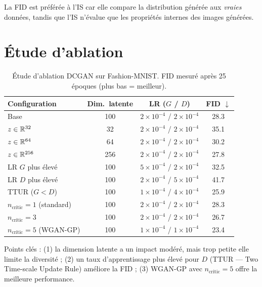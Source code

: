 \begin{remarque}
La FID est pr\'ef\'er\'ee \`a l'IS car elle compare la distribution g\'en\'er\'ee aux \emph{vraies} donn\'ees, tandis que l'IS n'\'evalue que les propri\'et\'es internes des images g\'en\'er\'ees.
\end{remarque}

\section{\'Etude d'ablation}
\label{sec:gan-ablation}

\begin{table}[htbp]
\centering
\caption{\'Etude d'ablation DCGAN sur Fashion-MNIST. FID mesur\'e apr\`es 25 \'epoques (plus bas = meilleur).}
\label{tab:gan-ablation}
\begin{tabular}{lccc}
\toprule
\textbf{Configuration} & \textbf{Dim.\ latente} & \textbf{LR ($G$ / $D$)} & \textbf{FID} $\downarrow$ \\
\midrule
Base & 100 & $2\!\times\!10^{-4}$ / $2\!\times\!10^{-4}$ & 28.3 \\
\midrule
$z \in \mathbb{R}^{32}$ & 32 & $2\!\times\!10^{-4}$ / $2\!\times\!10^{-4}$ & 35.1 \\
$z \in \mathbb{R}^{64}$ & 64 & $2\!\times\!10^{-4}$ / $2\!\times\!10^{-4}$ & 30.2 \\
$z \in \mathbb{R}^{256}$ & 256 & $2\!\times\!10^{-4}$ / $2\!\times\!10^{-4}$ & 27.8 \\
\midrule
LR $G$ plus \'elev\'e & 100 & $5\!\times\!10^{-4}$ / $2\!\times\!10^{-4}$ & 32.5 \\
LR $D$ plus \'elev\'e & 100 & $2\!\times\!10^{-4}$ / $5\!\times\!10^{-4}$ & 41.7 \\
TTUR ($G < D$) & 100 & $1\!\times\!10^{-4}$ / $4\!\times\!10^{-4}$ & 25.9 \\
\midrule
$n_{\text{critic}}=1$ (standard) & 100 & $2\!\times\!10^{-4}$ / $2\!\times\!10^{-4}$ & 28.3 \\
$n_{\text{critic}}=3$ & 100 & $2\!\times\!10^{-4}$ / $2\!\times\!10^{-4}$ & 26.7 \\
$n_{\text{critic}}=5$ (WGAN-GP) & 100 & $1\!\times\!10^{-4}$ / $1\!\times\!10^{-4}$ & 23.4 \\
\bottomrule
\end{tabular}
\end{table}

\begin{remarque}
Points cl\'es : (1) la dimension latente a un impact mod\'er\'e, mais trop petite elle limite la diversit\'e ; (2) un taux d'apprentissage plus \'elev\'e pour $D$ (TTUR --- Two Time-scale Update Rule) am\'eliore la FID ; (3) WGAN-GP avec $n_{\text{critic}}=5$ offre la meilleure performance.
\end{remarque}

